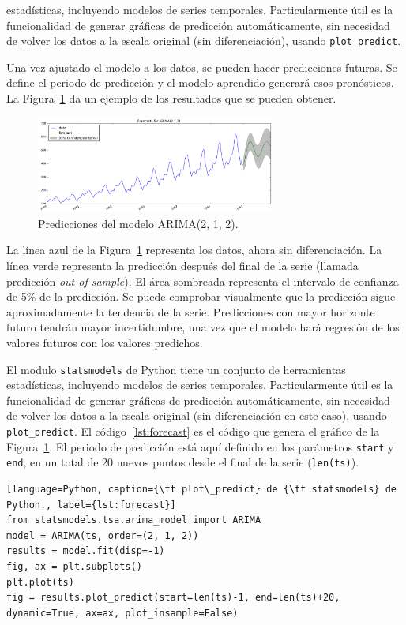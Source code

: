\documentclass[11pt,spanish,listoffigures,listoftables]{tfgetsinf}
\begin{document}
    estadísticas, incluyendo modelos de series temporales. Particularmente útil es la funcionalidad de generar gráficas de predicción automáticamente, sin necesidad de volver los datos a la escala original (sin diferenciación), usando {\tt plot\_predict}. 

    Una vez ajustado el modelo a los datos, se pueden hacer predicciones futuras. Se define el periodo de predicción y el modelo aprendido generará esos pronósticos. La Figura~\ref{fig:forecast} da un ejemplo de los resultados que se pueden obtener. 

    \begin{figure}[h]
        \centering
        \includegraphics[width=0.7\textwidth]{forecast.png}
        \caption{Predicciones del modelo ARIMA(2, 1, 2).}
        \label{fig:forecast}
    \end{figure}

    La línea azul de la Figura~\ref{fig:forecast} representa los datos, ahora sin diferenciación. La línea verde representa la predicción después del final de la serie (llamada predicción {\em out-of-sample}). El área sombreada representa el intervalo de confianza de 5\% de la predicción. Se puede comprobar visualmente que la predicción sigue aproximadamente la tendencia de la serie. Predicciones con mayor horizonte futuro tendrán mayor incertidumbre, una vez que el modelo hará regresión de los valores futuros con los valores predichos.

    El modulo {\tt statsmodels} de Python tiene un conjunto de herramientas estadísticas, incluyendo modelos de series temporales. Particularmente útil es la funcionalidad de generar gráficas de predicción automáticamente, sin necesidad de volver los datos a la escala original (sin diferenciación en este caso), usando {\tt plot\_predict}. El código~\ref{lst:forecast} es el código que genera el gráfico de la Figura~\ref{fig:forecast}. El periodo de predicción está aquí definido en los parámetros {\tt start} y {\tt end}, en un total de 20 nuevos puntos desde el final de la serie ({\tt len(ts)}).

    \begin{lstlisting}[language=Python, caption={\tt plot\_predict} de {\tt statsmodels} de Python., label={lst:forecast}]
from statsmodels.tsa.arima_model import ARIMA
model = ARIMA(ts, order=(2, 1, 2))
results = model.fit(disp=-1)
fig, ax = plt.subplots()
plt.plot(ts)
fig = results.plot_predict(start=len(ts)-1, end=len(ts)+20, dynamic=True, ax=ax, plot_insample=False)
    \end{lstlisting}
\end{document}
